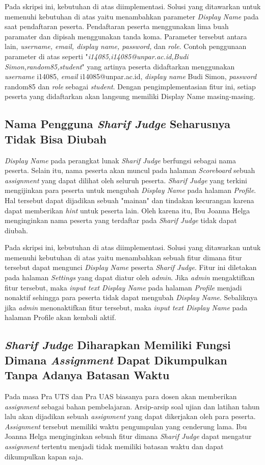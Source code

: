 Pada skripsi ini, kebutuhan di atas diimplementasi. Solusi yang ditawarkan untuk memenuhi kebutuhan di atas yaitu menambahkan parameter \textit{Display Name} pada saat pendaftaran peserta. Pendaftaran peserta menggunakan lima buah paramater dan dipisah menggunakan tanda koma. Parameter tersebut antara lain,\textit{ username, email, display name, password,} dan \textit{role}. Contoh penggunaan parameter di atas seperti "\textit{i14085,i14085@unpar.ac.id,Budi Simon,random85,student}" yang artinya peserta didaftarkan menggunakan \textit{username} i14085, \textit{email} i14085@unpar.ac.id, \textit{display name} Budi Simon, \textit{password} random85 dan \textit{role} sebagai \textit{student}. Dengan pengimplementasian fitur ini, setiap peserta yang didaftarkan akan langsung memiliki Display Name masing-masing.

\subsection{Nama Pengguna \textit{Sharif Judge} Seharusnya Tidak Bisa Diubah}
\textit{Display Name} pada perangkat lunak \textit{Sharif Judge} berfungsi sebagai nama peserta. Selain itu, nama peserta akan muncul pada halaman \textit{Scoreboard} sebuah \textit{assignment} yang dapat dilihat oleh seluruh peserta. \textit{Sharif Judge} yang terkini mengijinkan para peserta untuk mengubah \textit{Display Name} pada halaman \textit{Profile}. Hal tersebut dapat dijadikan sebuah "mainan" dan tindakan kecurangan karena dapat memberikan \textit{hint} untuk peserta lain. Oleh karena itu, Ibu Joanna Helga menginginkan nama peserta yang terdaftar pada \textit{Sharif Judge} tidak dapat diubah. 

Pada skripsi ini, kebutuhan di atas diimplementasi. Solusi yang ditawarkan untuk memenuhi kebutuhan di atas yaitu menambahkan sebuah fitur dimana fitur tersebut dapat mengunci \textit{Display Name} peserta \textit{Sharif Judge}. Fitur ini diletakan pada halaman \textit{Settings} yang dapat diatur oleh \textit{admin}. Jika \textit{admin} mengaktifkan fitur tersebut, maka \textit{input text Display Name} pada halaman \textit{Profile} menjadi nonaktif sehingga para peserta tidak dapat mengubah \textit{Display Name}. Sebaliknya jika \textit{admin} menonaktifkan fitur tersebut, maka \textit{input text Display Name} pada halaman Profile akan kembali aktif.

\subsection{\textit{Sharif Judge} Diharapkan Memiliki Fungsi Dimana \textit{Assignment} Dapat Dikumpulkan Tanpa Adanya Batasan Waktu}
Pada masa Pra UTS dan Pra UAS biasanya para dosen akan memberikan \textit{assignment} sebagai bahan pembelajaran. Arsip-arsip soal ujian dan latihan tahun lalu akan dijadikan sebuah \textit{assignment} yang dapat dikerjakan oleh para peserta. \textit{Assignment} tersebut memiliki waktu pengumpulan yang cenderung lama. Ibu Joanna Helga menginginkan sebuah fitur dimana \textit{Sharif Judge} dapat mengatur \textit{assignment} tertentu menjadi tidak memiliki batasan waktu dan dapat dikumpulkan kapan saja. 

